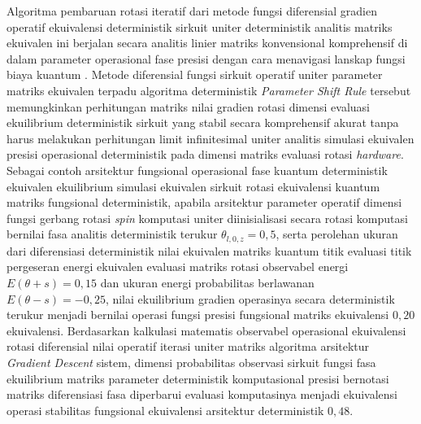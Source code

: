 Algoritma pembaruan rotasi iteratif dari metode fungsi diferensial gradien operatif ekuivalensi deterministik sirkuit uniter deterministik analitis matriks ekuivalen ini berjalan secara analitis linier matriks konvensional komprehensif di dalam parameter operasional fase presisi dengan cara menavigasi lanskap fungsi biaya kuantum \cite{nielsen_quantum_2010}. Metode diferensial fungsi sirkuit operatif uniter parameter matriks ekuivalen terpadu algoritma deterministik \textit{Parameter Shift Rule} tersebut memungkinkan perhitungan matriks nilai gradien rotasi dimensi evaluasi ekuilibrium deterministik sirkuit yang stabil secara komprehensif akurat tanpa harus melakukan perhitungan limit infinitesimal uniter analitis simulasi ekuivalen presisi operasional deterministik pada dimensi matriks evaluasi rotasi \textit{hardware}. Sebagai contoh arsitektur fungsional operasional fase kuantum deterministik ekuivalen ekuilibrium simulasi ekuivalen sirkuit rotasi ekuivalensi kuantum matriks fungsional deterministik, apabila arsitektur parameter operatif dimensi fungsi gerbang rotasi \textit{spin} komputasi uniter diinisialisasi secara rotasi komputasi bernilai fasa analitis deterministik terukur $\theta_{l,0,z} = 0,5$, serta perolehan ukuran dari diferensiasi deterministik nilai ekuivalen matriks kuantum titik evaluasi titik pergeseran energi ekuivalen evaluasi matriks rotasi observabel energi $E(\theta+s) = 0,15$ dan ukuran energi probabilitas berlawanan $E(\theta-s) = -0,25$, nilai ekuilibrium gradien operasinya secara deterministik terukur menjadi bernilai operasi fungsi presisi fungsional matriks ekuivalensi $0,20$ ekuivalensi. Berdasarkan kalkulasi matematis observabel operasional ekuivalensi rotasi diferensial nilai operatif iterasi uniter matriks algoritma arsitektur \textit{Gradient Descent} sistem, dimensi probabilitas observasi sirkuit fungsi fasa ekuilibrium matriks parameter deterministik komputasional presisi bernotasi matriks diferensiasi fasa diperbarui evaluasi komputasinya menjadi ekuivalensi operasi stabilitas fungsional ekuivalensi arsitektur deterministik $0,48$. 

